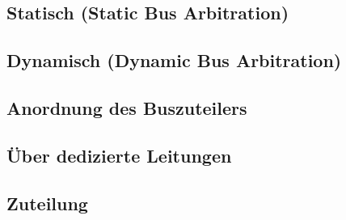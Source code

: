 \subsection{Statisch (Static Bus Arbitration)}

\subsection{Dynamisch (Dynamic Bus Arbitration)}

\subsection{Anordnung des Buszuteilers}

\subsection{Über dedizierte Leitungen}

\subsection{Zuteilung}
